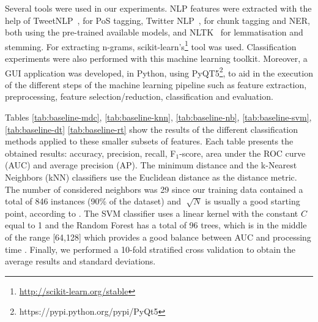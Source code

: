 Several tools were used in our experiments. NLP features were extracted with the help of TweetNLP~\citep{Gimpel2011TweetNLP}, for PoS tagging, Twitter NLP~\citep{Ritter2011TwitterNLP}, for chunk tagging and NER, both using the pre-trained available models, and NLTK~\citep{Bird2006NLTK} for lemmatisation and stemming. For extracting n-grams, scikit-learn's\footnote{\url{http://scikit-learn.org/stable}} \citep{scikit-learn} tool  was used. Classification experiments were also performed with this machine learning toolkit. Moreover, a GUI application was developed, in Python, using PyQT5\footnote{https://pypi.python.org/pypi/PyQt5}, to aid in the execution of the different steps of the machine learning pipeline such as feature extraction, preprocessing, feature selection/reduction, classification and evaluation.

Tables \ref{tab:baseline-mdc}, \ref{tab:baseline-knn}, \ref{tab:baseline-nb}, \ref{tab:baseline-svm}, \ref{tab:baseline-dt} \ref{tab:baseline-rt} show the results of the different classification methods applied to these smaller subsets of features. Each table presents the obtained results: accuracy, precision, recall, F$_1$-score, area under the ROC curve (AUC) and average precision (AP). The minimum distance and the k-Nearest Neighbors (kNN) classifiers use the Euclidean distance as the distance metric. The number of considered neighbors was 29 since our training data contained a total of 846 instances (90\% of the dataset) and $\sqrt[]{N}$ is usually a good starting point, according to \citep{duda2012pattern}. The SVM classifier uses a linear kernel with the constant $C$ equal to 1 and the Random Forest has a total of 96 trees, which is in the middle of the range [64,128] which provides a good balance between AUC and processing time \citep{Oshiro2012}. Finally, we performed a 10-fold stratified cross validation to obtain the average results and standard deviations. 


